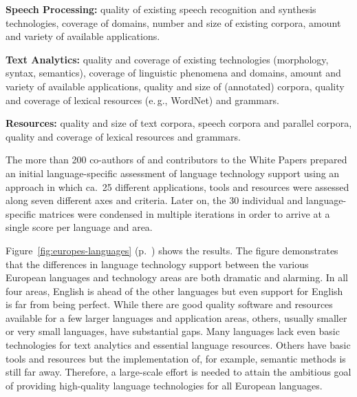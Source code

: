 \documentclass[10pt, plain]{../../metanetpaper}
\begin{document}
\begin{multicols}{2}
\textbf{Speech Processing:} quality of existing speech recognition and synthesis technologies, coverage of domains, number and size of existing corpora, amount and variety of available applications.

\textbf{Text Analytics:} quality and coverage of existing technologies (morphology, syntax, semantics), coverage of linguistic phenomena and domains, amount and variety of available applications, quality and size of (annotated) corpora, quality and coverage of lexical resources (e.\,g., WordNet) and grammars.

\textbf{Resources:} quality and size of text corpora, speech corpora and parallel corpora, quality and coverage of lexical resources and grammars.

The more than 200 co-authors of and contributors to the White Papers prepared an initial language-specific assessment of language technology support using an approach in which ca.~25 different applications, tools and resources were assessed along seven different axes and criteria. Later on, the 30 individual and language-specific matrices were condensed in multiple iterations in order to arrive at a single score per language and area. 

Figure~\ref{fig:europes-languages} (p.~\pageref{fig:europes-languages}) shows the results. The figure demonstrates that the differences in language technology support between the various European languages and technology areas are both dramatic and alarming. In all four areas, English is ahead of the other languages but even support for English is far from being perfect. While there are good quality software and resources available for a few larger languages and application areas, others, usually smaller or very small languages, have substantial gaps. Many languages lack even basic technologies for text analytics and essential language resources. Others have basic tools and resources but the implementation of, for example, semantic methods is still far away. Therefore, a large-scale effort is needed to attain the ambitious goal of providing high-quality language technologies for all European languages.


\end{multicols}
\end{document}
